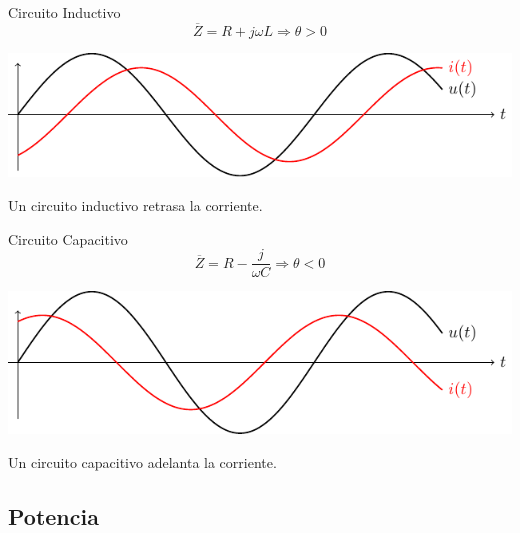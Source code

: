 \documentclass[xcolor={usenames,svgnames,dvipsnames}]{beamer}
\begin{document}
\begin{frame}[label={sec:org2171cc1}]{Circuito Inductivo}
\[
\overline{Z} = R + j\omega L \Rightarrow \theta > 0
\]

\begin{center}
\includegraphics[width=.9\linewidth]{../figs/inductivo.pdf}
\end{center}

Un circuito inductivo \alert{retrasa la corriente}.
\end{frame}

\begin{frame}[label={sec:org44a91d4}]{Circuito Capacitivo}
\[
\overline{Z} = R - \frac{j}{\omega C} \Rightarrow \theta < 0
\]

\begin{center}
\includegraphics[width=.9\linewidth]{../figs/capacitivo.pdf}
\end{center}

Un circuito capacitivo \alert{adelanta la corriente}.
\end{frame}

\subsection{Potencia}
\label{sec:orgb78f3f1}
\end{document}
